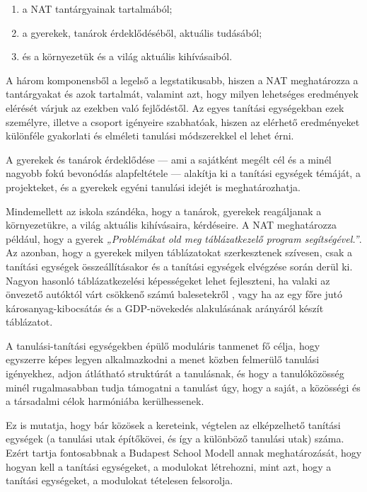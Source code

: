 \begin{enumerate}
\def\labelenumi{\arabic{enumi}.}
\item
  a NAT tantárgyainak tartalmából;
\item
  a gyerekek, tanárok érdeklődéséből, aktuális tudásából;
\item
  és a környezetük és a világ aktuális kihívásaiból.
\end{enumerate}

A három komponensből a legelső a legstatikusabb, hiszen a NAT
meghatározza a tantárgyakat és azok tartalmát, valamint azt, hogy milyen
lehetséges eredmények elérését várjuk az ezekben való fejlődéstől. Az
egyes tanítási egységekban ezek személyre, illetve a csoport igényeire
szabhatóak, hiszen az elérhető eredményeket különféle gyakorlati és
elméleti tanulási módszerekkel el lehet érni.

A gyerekek és tanárok érdeklődése --- ami a sajátként megélt cél és a
minél nagyobb fokú bevonódás alapfeltétele --- alakítja ki a tanítási
egységek témáját, a projekteket, és a gyerekek egyéni tanulási idejét is
meghatározhatja.

Mindemellett az iskola szándéka, hogy a tanárok, gyerekek reagáljanak a
környezetükre, a világ aktuális kihívásaira, kérdéseire. A NAT
meghatározza például, hogy a gyerek \emph{„Problémákat old meg
táblázatkezelő\break
program segítségével.''}. Az azonban, hogy a gyerekek
milyen táblázatokat szerkesztenek szívesen, csak a tanítási egységek
összeállításakor és a tanítási egységek elvégzése során derül ki. Nagyon
hasonló táblázatkezelési képességeket lehet fejleszteni, ha valaki az
önvezető autóktól várt csökkenő számú balesetekről , vagy ha az egy főre
jutó károsanyag-kibocsátás és a GDP-növekedés alakulásának arányáról
készít táblázatot.

A tanulási-tanítási egységekben épülő moduláris tanmenet fő célja, hogy
egyszerre képes legyen alkalmazkodni a menet közben felmerülő tanulási
igényekhez, adjon átlátható struktúrát a tanulásnak, és hogy a
tanulóközösség minél rugalmasabban tudja támogatni a tanulást úgy, hogy
a saját, a közösségi és a társadalmi célok harmóniába kerülhessenek.

Ez is mutatja, hogy bár közösek a kereteink, végtelen az elképzelhető
tanítási egységek (a tanulási utak építőkövei, és így a különböző
tanulási utak) száma. Ezért tartja fontosabbnak a Budapest School Modell
annak meghatározását, hogy hogyan kell a tanítási egységeket, a
modulokat létrehozni, mint azt, hogy a tanítási egységeket, a modulokat
tételesen felsorolja.

